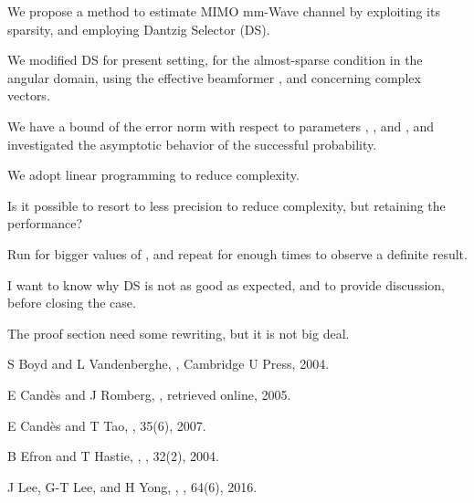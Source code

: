 {
\I We propose a method to estimate MIMO mm-Wave channel  by exploiting its sparsity, and employing Dantzig Selector (DS).

\I We modified DS for present setting, for the almost-sparse condition in the angular domain, using the effective beamformer , and concerning complex vectors.

\I We have a bound of the error norm with respect to parameters , , and , and investigated the asymptotic behavior of the successful probability.

\I We adopt linear programming to reduce complexity.
}
{
\I Is it possible to resort to less precision to reduce complexity, but retaining the performance?

\I Run for bigger values of ,  and repeat for enough times to observe a definite result.

\I I want to know why DS is not as good as expected, and to provide discussion, before closing the case.

\I The proof section need some rewriting, but it is not big deal.
}
{
{\tfx
\I S Boyd and L Vandenberghe, , Cambridge U Press, 2004.

\I E Candès and J Romberg, , retrieved online, 2005.

\I E Candès and T Tao, ,  35(6), 2007.

\I B Efron and T Hastie, , , 32(2), 2004.

\I J Lee, G-T Lee, and H Yong, , , 64(6), 2016.
}
}


